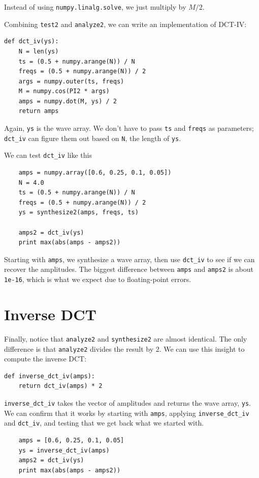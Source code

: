 \documentclass[12pt]{book}
\begin{document}
Instead of using {\tt numpy.linalg.solve}, we just multiply
by $M/2$.

Combining {\tt test2} and {\tt analyze2}, we can write an
implementation of DCT-IV:

\begin{verbatim}
def dct_iv(ys):
    N = len(ys)
    ts = (0.5 + numpy.arange(N)) / N
    freqs = (0.5 + numpy.arange(N)) / 2
    args = numpy.outer(ts, freqs)
    M = numpy.cos(PI2 * args)
    amps = numpy.dot(M, ys) / 2
    return amps
\end{verbatim}

Again, {\tt ys} is the wave array.  We don't have to pass
{\tt ts} and {\tt freqs} as parameters; \verb"dct_iv" can
figure them out based on {\tt N}, the length of {\tt ys}.

We can test \verb"dct_iv" like this

\begin{verbatim}
    amps = numpy.array([0.6, 0.25, 0.1, 0.05])
    N = 4.0
    ts = (0.5 + numpy.arange(N)) / N
    freqs = (0.5 + numpy.arange(N)) / 2
    ys = synthesize2(amps, freqs, ts)

    amps2 = dct_iv(ys)
    print max(abs(amps - amps2))
\end{verbatim}

Starting with {\tt amps}, we synthesize a wave array, then use
\verb"dct_iv" to see if we can recover the amplitudes.  The biggest
difference between {\tt amps} and {\tt amps2} is about {\tt 1e-16},
which is what we expect due to floating-point errors.


\section{Inverse DCT}

Finally, notice that {\tt analyze2} and {\tt synthesize2} are almost
identical.  The only difference is that {\tt analyze2} divides the
result by 2.  We can use this insight to compute the inverse DCT:

\begin{verbatim}
def inverse_dct_iv(amps):
    return dct_iv(amps) * 2
\end{verbatim}

\verb"inverse_dct_iv" takes the vector of amplitudes and returns
the wave array, {\tt ys}.  We can confirm that it works by starting
with {\tt amps}, applying \verb"inverse_dct_iv" and \verb"dct_iv",
and testing that we get back what we started with.

\begin{verbatim}
    amps = [0.6, 0.25, 0.1, 0.05]
    ys = inverse_dct_iv(amps)
    amps2 = dct_iv(ys)
    print max(abs(amps - amps2))
\end{verbatim}
\end{document}
